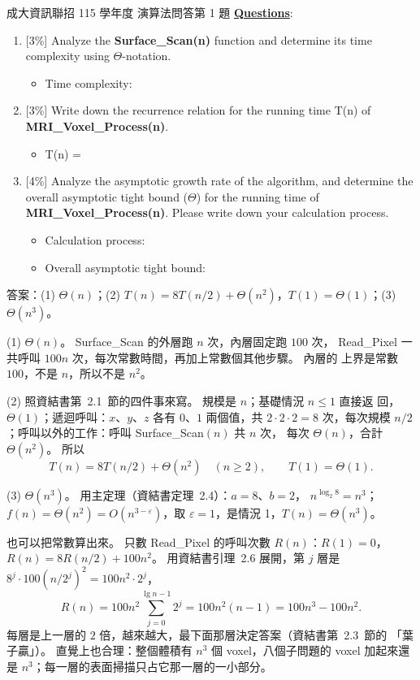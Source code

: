 \begin{pastexam}[label={px:ncku-115-prog-14}]{成大資訊聯招 115 學年度 演算法問答第 1 題}
\underline{\textbf{Questions}}:
\begin{enumerate}[label=(\arabic*)]
\item {[3\%]} Analyze the \textbf{Surface\_Scan(n)} function and determine its time
complexity using $\Theta$-notation.
\begin{itemize}\item Time complexity: \underline{\hspace{5cm}}\end{itemize}
\item {[3\%]} Write down the recurrence relation for the running time T(n) of
\textbf{MRI\_Voxel\_Process(n)}.
\begin{itemize}\item T(n) = \underline{\hspace{5cm}}\end{itemize}
\item {[4\%]} Analyze the asymptotic growth rate of the algorithm, and determine the
overall asymptotic tight bound ($\Theta$) for the running time of
\textbf{MRI\_Voxel\_Process(n)}. Please write down your calculation process.
\begin{itemize}
\item Calculation process: \underline{\hspace{5cm}}
\item Overall asymptotic tight bound: \underline{\hspace{4cm}}
\end{itemize}
\end{enumerate}
\end{pastexam}

\begin{pastsoln}
答案：(1) $\Theta(n)$；(2) $T(n) = 8T(n/2) + \Theta(n^2)$，$T(1) = \Theta(1)$；(3) $\Theta(n^3)$。

(1) $\Theta(n)$。 \textsf{Surface\_Scan} 的外層跑 $n$ 次，內層固定跑 $100$ 次，
\textsf{Read\_Pixel} 一共呼叫 $100n$ 次，每次常數時間，再加上常數個其他步驟。 內層的
上界是常數 $100$，不是 $n$，所以不是 $n^2$。

(2) 照資結書第~2.1~節的四件事來寫。 規模是 $n$；基礎情況 $n \le 1$ 直接返
回，$\Theta(1)$；遞迴呼叫：$x$、$y$、$z$ 各有 $0$、$1$ 兩個值，共 $2 \cdot 2 \cdot 2
= 8$ 次，每次規模 $n/2$；呼叫以外的工作：呼叫 \textsf{Surface\_Scan}$(n)$ 共 $n$ 次，
每次 $\Theta(n)$，合計 $\Theta(n^2)$。 所以
\[
T(n) = 8T(n/2) + \Theta(n^2) \quad (n \ge 2), \qquad T(1) = \Theta(1).
\]

(3) $\Theta(n^3)$。 用主定理（資結書定理~2.4）：$a = 8$、$b = 2$，
$n^{\log_2 8} = n^3$；$f(n) = \Theta(n^2) = O(n^{3 - \varepsilon})$，取
$\varepsilon = 1$，是情況 1，$T(n) = \Theta(n^3)$。

也可以把常數算出來。 只數 \textsf{Read\_Pixel} 的呼叫次數 $R(n)$：$R(1) = 0$，
$R(n) = 8R(n/2) + 100n^2$。 用資結書引理~2.6 展開，第 $j$ 層是
$8^j \cdot 100 (n/2^j)^2 = 100 n^2 \cdot 2^j$，
\[
R(n) = 100 n^2 \sum_{j=0}^{\lg n - 1} 2^j = 100 n^2 (n - 1) = 100 n^3 - 100 n^2 .
\]
每層是上一層的 $2$ 倍，越來越大，最下面那層決定答案（資結書第~2.3~節的
「葉子贏」）。 直覺上也合理：整個體積有 $n^3$ 個 voxel，八個子問題的 voxel 加起來還
是 $n^3$；每一層的表面掃描只占它那一層的一小部分。
\end{pastsoln}
